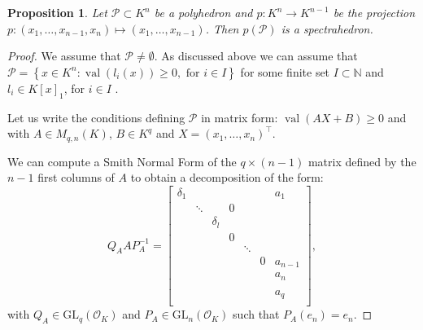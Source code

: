 \documentclass[a4paper,oneside,11pt]{article}
\newtheorem{proposition}[theorem]{Proposition}
\newcommand{\N}{\mathbb{N}} %
\newcommand{\PP}{\mathcal{P}}
\DeclareMathOperator{\val}{val}
\newcommand{\OK}{\mathcal{O}_K}
\newcommand{\GL}{\mathrm{GL}}
\begin{document}
\begin{proposition}
      Let $\PP \subset K^n$ be a polyhedron and $p : K^n \to K^{n-1}$ be the projection $p : (x_1,\dots,x_{n-1},x_n) \mapsto (x_1, \dots, x_{n-1})$.
       Then $p(\PP)$ is a spectrahedron.
\end{proposition}


\begin{proof}
      
We assume that $\PP \neq \emptyset$.
As discussed above we can assume that
  $\PP = \left\lbrace x \in K^n : \val (l_i (x) ) \geq 0,\textrm{ for } i \in I \right\rbrace$ for some
finite set $I \subset \N$ and $l_i \in K[x]_1$, for $i \in I$ .

Let us write the conditions defining $\PP$
in matrix form:
$\val(A X+B) \geq 0$ and 
with $A \in M_{q,n}(K)$, $B \in K^q$
and $X=(x_1,\dots,x_n)^\intercal$. 


We can compute a Smith Normal Form
of the $q \times (n-1)$ matrix defined by the 
$n-1$ first columns of $A$
to obtain a decomposition of the form:
\[ Q_A A P_A^{-1} = \begin{bmatrix}
\delta_1	& 		& 			&   &		 &  &a_1	\\
			& \ddots& 			& 0	&		 &	&		\\
			&		& \delta_l  &   & 		 &	&		\\
			&		&			&0  & 		 &	& 		\\
			&		&			&   & \ddots &	&		\\
			&		&			&	&		 & 0&a_{n-1} \\
			&		&			&	&		 &	&a_n 	\\
			&		&			&	&		 &	&    	\\
			&		&			&	&		 &	&a_q 	\\			
\end{bmatrix},\]
with $Q_A \in \GL_q(\OK)$ and $P_A \in \GL_n(\OK)$ such that $P_A(e_n)=e_n.$


\end{proof}
\end{document}
